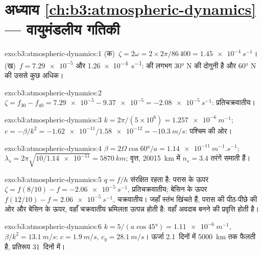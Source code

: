 \section*{अध्याय \ref{ch:b3:atmospheric-dynamics} --- वायुमंडलीय गतिकी}

\begin{solution}{exo:b3:atmospheric-dynamics:1}
(क)~$\zeta = 2\omega = 2\times2\pi/86\,400 = \qty{1.45e-4}{s^{-1}}$।
(ख)~$f = \num{7.29e-5}$ और \qty{1.26e-4}{s^{-1}}:  की  लगभग
\ang{30} N की दोगुनी है और
\ang{60} N की उससे कुछ अधिक।
\end{solution}

\begin{solution}{exo:b3:atmospheric-dynamics:2}
$\zeta = f_{30} - f_{40} = \num{7.29e-5} - \num{9.37e-5} =
\qty{-2.08e-5}{s^{-1}}$: प्रतिचक्रवातीय।
\end{solution}

\begin{solution}{exo:b3:atmospheric-dynamics:3}
$k = 2\pi/(5\times10^6) = \qty{1.257e-6}{m^{-1}}$; $c = -\beta/k^2 =
-\num{1.62e-11}/\num{1.58e-12} = \qty{-10.3}{m/s}$: पश्चिम की ओर।
\end{solution}

\begin{solution}{exo:b3:atmospheric-dynamics:4}
$\beta = 2\Omega\cos\ang{60}/a = \qty{1.14e-11}{m^{-1}.s^{-1}}$;
$\lambda_s = 2\pi\sqrt{10/\num{1.14e-11}} = \qty{5870}{km}$; वृत्त,
\qty{20015}{km} में $n_s = 3.4$ तरंगें समाती हैं।
\end{solution}

\begin{solution}{exo:b3:atmospheric-dynamics:5}
$q = f/h$ संरक्षित रहता है: परास के ऊपर $\zeta = f(8/10) - f =
\qty{-2.06e-5}{s^{-1}}$, प्रतिचक्रवातीय; बेसिन के ऊपर $f(12/10) - f =
\qty{+2.06e-5}{s^{-1}}$, चक्रवातीय। जहाँ स्तंभ खिंचते हैं, परास की पीठ-पीछे की ओर
और बेसिन के ऊपर, वहाँ चक्रवातीय भ्रमिलता उत्पन्न होती है:
वहाँ अवदाब बनने की प्रवृत्ति होती है।
\end{solution}

\begin{solution}{exo:b3:atmospheric-dynamics:6}
$k = 5/(a\cos\ang{45}) = \qty{1.11e-6}{m^{-1}}$, $\beta/k^2 =
\qty{13.1}{m/s}$: $c = \qty{1.9}{m/s}$, $c_g = \qty{28.1}{m/s}$। ऊर्जा
\num{2.1}~दिनों में \qty{5000}{km} तक फैलती है, प्रतिरूप \num{31}~दिनों में।
\end{solution}

